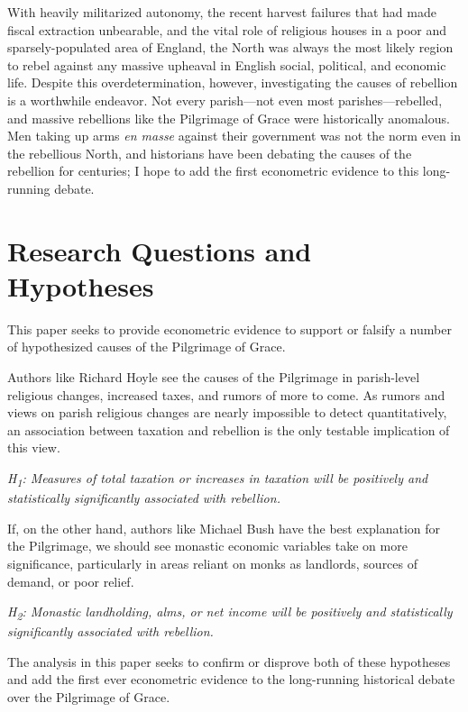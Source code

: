 \documentclass[12pt]{article}
\begin{document}
With heavily militarized autonomy, the recent harvest failures that had made fiscal extraction unbearable, and the vital role of religious houses in a poor and sparsely-populated area of England, the North was always the most likely region to rebel against any massive upheaval in English social, political, and economic life. Despite this overdetermination, however, investigating the causes of rebellion is a worthwhile endeavor. Not every parish---not even most parishes---rebelled, and massive rebellions like the Pilgrimage of Grace were historically anomalous. Men taking up arms \emph{en masse} against their government was not the norm even in the rebellious North, and historians have been debating the causes of the rebellion for centuries; I hope to add the first econometric evidence to this long-running debate.

\section{Research Questions and Hypotheses}

This paper seeks to provide econometric evidence to support or falsify a number of hypothesized causes of the Pilgrimage of Grace.

Authors like Richard Hoyle see the causes of the Pilgrimage in parish-level religious changes, increased taxes,\autocite[173-4]{Hoyle1993} and rumors of more to come.\autocite[17, 88-91]{Hoyle2001} As rumors and views on parish religious changes are nearly impossible to detect quantitatively, an association between taxation and rebellion is the only testable implication of this view.

\emph{H\textsubscript{1}: Measures of total taxation or increases in taxation will be positively and statistically significantly associated with rebellion.}

If, on the other hand, authors like Michael Bush have the best explanation for the Pilgrimage, we should see monastic economic variables take on more significance, particularly in areas reliant on monks as landlords, sources of demand, or poor relief.\autocite[18, 276]{Bush1996} 

\emph{H\textsubscript{2}: Monastic landholding, alms, or net income will be positively and statistically significantly associated with rebellion.}

The analysis in this paper seeks to confirm or disprove both of these hypotheses and add the first ever econometric evidence to the long-running historical debate over the Pilgrimage of Grace.
\end{document}
